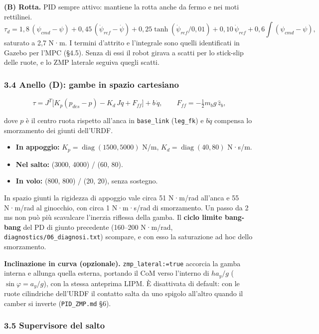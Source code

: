 \documentclass[
]{article}
\providecommand{\tightlist}{%
  \setlength{\itemsep}{0pt}\setlength{\parskip}{0pt}}
\begin{document}
\textbf{(B) Rotta.} PID sempre attivo: mantiene la rotta anche da fermo e nei moti rettilinei. \[\tau_d = 1{,}8\,(\psi_{cmd}-\psi) + 0{,}45\,(\dot\psi_{ref}-\dot\psi) + 0{,}25\tanh(\dot\psi_{ref}/0{,}01) + 0{,}10\,\dot\psi_{ref} + 0{,}6\!\textstyle\int(\psi_{cmd}-\psi),\] saturato a 2,7 N·m. I termini d'attrito e l'integrale sono quelli identificati in Gazebo per l'MPC (§4.5). Senza di essi il robot girava a scatti per lo stick-slip delle ruote, e lo ZMP laterale seguiva quegli scatti.

\subsubsection{3.4 Anello (D): gambe in spazio cartesiano}\label{34-anello-d-gambe-in-spazio-cartesiano}

\[\tau = J^T\big[K_p(p_{des} - p) - K_d\,J\dot q + F_{ff}\big] + b\,\dot q,\qquad F_{ff} = -\tfrac12 m_bg\,\hat z_b,\]

dove \(p\) è il centro ruota rispetto all'anca in \texttt{base\_link} (\texttt{leg\_fk}) e \(b\dot q\) compensa lo smorzamento dei giunti dell'URDF.

\begin{itemize}
\tightlist
\item \textbf{In appoggio:} \(K_p = \operatorname{diag}(1500, 5000)\) N/m, \(K_d = \operatorname{diag}(40, 80)\) N·s/m.
\item \textbf{Nel salto:} (3000, 4000) / (60, 80).
\item \textbf{In volo:} (800, 800) / (20, 20), senza sostegno.
\end{itemize}

In spazio giunti la rigidezza di appoggio vale circa 51 N·m/rad all'anca e 55 N·m/rad al ginocchio, con circa 1 N·m·s/rad di smorzamento. Un passo da 2 ms non può più scavalcare l'inerzia riflessa della gamba. Il \textbf{ciclo limite bang-bang} del PD di giunto precedente (160–200 N·m/rad, \texttt{diagnostics/06\_diagnosi.txt}) scompare, e con esso la saturazione ad hoc dello smorzamento.

\textbf{Inclinazione in curva (opzionale).} \texttt{zmp\_lateral:=true} accorcia la gamba interna e allunga quella esterna, portando il CoM verso l'interno di \(h a_y/g\) (\(\sin\varphi = a_y/g\)), con la stessa anteprima LIPM. È disattivata di default: con le ruote cilindriche dell'URDF il contatto salta da uno spigolo all'altro quando il camber si inverte (\texttt{PID\_ZMP.md} §6).

\subsubsection{3.5 Supervisore del salto}\label{35-supervisore-del-salto}
\end{document}
